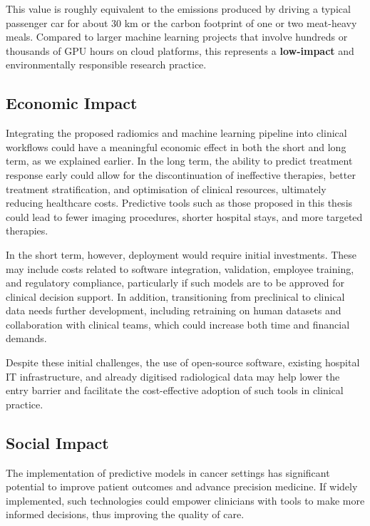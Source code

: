 \documentclass[12pt, a4paper]{report}
\begin{document}
This value is roughly equivalent to the emissions produced by driving a typical passenger car for about 30 km or the carbon footprint of one or two meat-heavy meals. Compared to larger machine learning projects that involve hundreds or thousands of GPU hours on cloud platforms, this represents a \textbf{low-impact} and environmentally responsible research practice.

\subsection{Economic Impact}

Integrating the proposed radiomics and machine learning pipeline into clinical workflows could have a meaningful economic effect in both the short and long term, as we explained earlier. In the long term, the ability to predict treatment response early could allow for the discontinuation of ineffective therapies, better treatment stratification, and optimisation of clinical resources, ultimately reducing healthcare costs. Predictive tools such as those proposed in this thesis could lead to fewer imaging procedures, shorter hospital stays, and more targeted therapies.

In the short term, however, deployment would require initial investments. These may include costs related to software integration, validation, employee training, and regulatory compliance, particularly if such models are to be approved for clinical decision support. In addition, transitioning from preclinical to clinical data needs further development, including retraining on human datasets and collaboration with clinical teams, which could increase both time and financial demands.

Despite these initial challenges, the use of open-source software, existing hospital IT infrastructure, and already digitised radiological data may help lower the entry barrier and facilitate the cost-effective adoption of such tools in clinical practice.

\subsection{Social Impact}

The implementation of predictive models in cancer settings has significant potential to improve patient outcomes and advance precision medicine. If widely implemented, such technologies could empower clinicians with tools to make more informed decisions, thus improving the quality of care.
\end{document}
